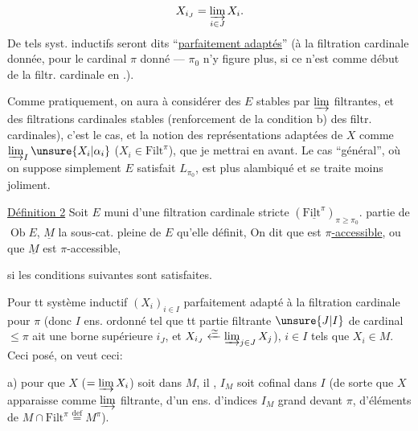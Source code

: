 \[
X_{i_J}=\varinjlim_{i\in J}X_i.
\]
De tels syst. inductifs seront dits ``\uline{parfaitement adaptés}'' (à la filtration cardinale donnée, pour le cardinal $\pi$ donné --- $\pi_0$ n'y figure plus, si ce n'est comme début de la filtr. cardinale en .).

Comme pratiquement, on aura à considérer des $E$ stables par  $\varinjlim$ filtrantes, et des filtrations cardinales stables   (renforcement de la condition b) des filtr. cardinales), c'est le cas,  et la notion des représentations  adaptées de $X$ comme $\varinjlim_I\unsure{X_i|\alpha_i}$ ($X_i\in\mathrm{Filt}^{\pi}$), que je mettrai en avant. Le cas ``général'', où on suppose simplement $E$ satisfait $L_{\pi_0}$, est plus alambiqué et se traite moins joliment.

\uline{Définition 2} Soit $E$ muni d'une filtration cardinale stricte $(\underline{\mathrm{Filt}^{\pi}})_{\pi\geq\pi_0}$.   partie  de $\operatorname{Ob}E$, $\underline M$ la sous-cat. pleine de $E$ qu'elle définit,  On dit que  est \uline{$\pi$-accessible}, ou que $\underline M$ est $\pi$-accessible,

si les conditions suivantes sont satisfaites.

Pour tt  système inductif $(X_i)_{i\in I}$ parfaitement adapté à la filtration cardinale pour $\pi$ (donc $I$ ens. ordonné   tel que tt partie filtrante $\unsure{J|I}$ de cardinal $\leq\pi$ ait une borne supérieure $i_J$, et $X_{i_J}\xleftarrow{\simeq}\varinjlim_{j\in J}X_j$),      $i\in I$ tels que $X_i\in M$.  Ceci posé, on veut ceci:

a) pour que $X$ ($=\varinjlim X_i$) soit dans $M$, il ,    $I_M$ soit cofinal dans $I$ (de sorte que $X$ apparaisse comme $\varinjlim$ filtrante, d'un ens. d'indices $I_M$ grand devant $\pi$, d'éléments de $M\cap\mathrm{Filt}^{\pi}\overset{\mathrm{def}}{=}M^{\pi}$).

